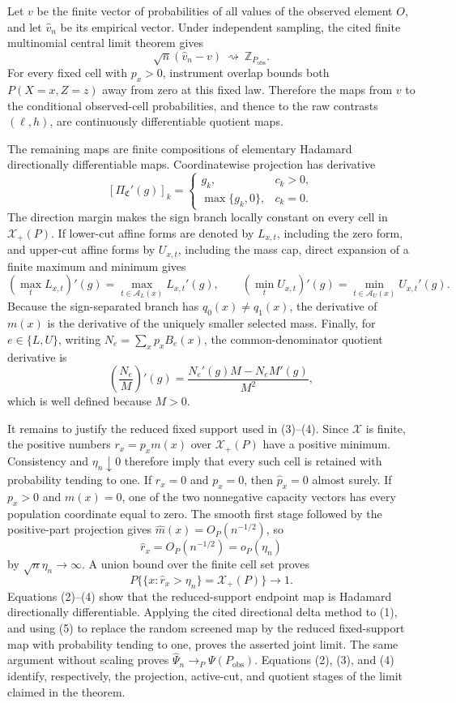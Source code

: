 Let \(v\) be the finite vector of probabilities of all values of the observed element \(O\), and let \(\widehat v_n\) be its empirical vector.  Under independent sampling, the cited finite multinomial central limit theorem gives
\[
\sqrt n(\widehat v_n-v)\ \rightsquigarrow\ \mathbb Z_{P_{\mathrm{obs}}}.
\tag{1}
\]
For every fixed cell with \(p_x>0\), instrument overlap bounds both \(P(X=x,Z=z)\) away from zero at this fixed law.  Therefore the maps from \(v\) to the conditional observed-cell probabilities, and thence to the raw contrasts \((\ell,h)\), are continuously differentiable quotient maps.

The remaining maps are finite compositions of elementary Hadamard directionally differentiable maps.  Coordinatewise projection has derivative
\[
[\Pi_{\mathfrak C}'(g)]_k=
\begin{cases}
g_k,&c_k>0,\\
\max\{g_k,0\},&c_k=0.
\end{cases}
\tag{2}
\]
The direction margin makes the sign branch locally constant on every cell in \(\mathcal X_+(P)\).  If lower-cut affine forms are denoted by \(L_{x,t}\), including the zero form, and upper-cut affine forms by \(U_{x,t}\), including the mass cap, direct expansion of a finite maximum and minimum gives
\[
\left(\max_tL_{x,t}\right)'(g)=\max_{t\in\mathcal A_L(x)}L_{x,t}'(g),
\qquad
\left(\min_tU_{x,t}\right)'(g)=\min_{t\in\mathcal A_U(x)}U_{x,t}'(g).
\tag{3}
\]
Because the sign-separated branch has \(q_0(x)\ne q_1(x)\), the derivative of \(m(x)\) is the derivative of the uniquely smaller selected mass.  Finally, for \(e\in\{L,U\}\), writing \(N_e=\sum_xp_xB_e(x)\), the common-denominator quotient derivative is
\[
\left(\frac{N_e}{M}\right)'(g)
=\frac{N_e'(g)M-N_eM'(g)}{M^2},
\tag{4}
\]
which is well defined because \(M>0\).

It remains to justify the reduced fixed support used in (3)--(4).  Since \(\mathcal X\) is finite, the positive numbers \(r_x=p_xm(x)\) over \(\mathcal X_+(P)\) have a positive minimum.  Consistency and \(\eta_n\downarrow0\) therefore imply that every such cell is retained with probability tending to one.  If \(r_x=0\) and \(p_x=0\), then \(\widehat p_x=0\) almost surely.  If \(p_x>0\) and \(m(x)=0\), one of the two nonnegative capacity vectors has every population coordinate equal to zero.  The smooth first stage followed by the positive-part projection gives \(\widehat m(x)=O_P(n^{-1/2})\), so
\[
\widehat r_x=O_P(n^{-1/2})=o_P(\eta_n)
\]
by \(\sqrt n\eta_n\to\infty\).  A union bound over the finite cell set proves
\[
P\{\{x:\widehat r_x>\eta_n\}=\mathcal X_+(P)\}\to1.
\tag{5}
\]
Equations (2)--(4) show that the reduced-support endpoint map is Hadamard directionally differentiable.  Applying the cited directional delta method to (1), and using (5) to replace the random screened map by the reduced fixed-support map with probability tending to one, proves the asserted joint limit.  The same argument without scaling proves \(\widehat\Psi_n\to_P\Psi(P_{\mathrm{obs}})\).  Equations (2), (3), and (4) identify, respectively, the projection, active-cut, and quotient stages of the limit claimed in the theorem.